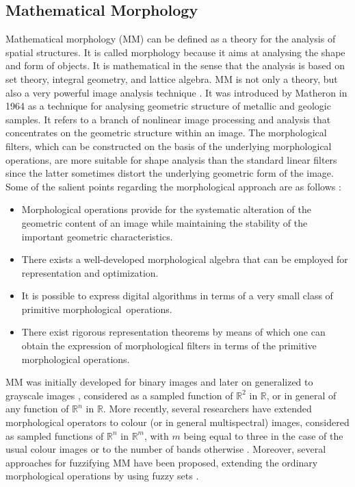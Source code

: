 \documentclass[sensors,review,accept,moreauthors,pdftex,10pt,a4paper]{mdpi}
\begin{document}
\fi
\subsection{Mathematical Morphology}
Mathematical morphology (MM) can be defined as a theory for the analysis of spatial structures. It is called morphology because it aims at analysing the shape and form of objects. It is mathematical in the sense that the analysis is based on set theory, integral geometry, and lattice algebra. MM is not only a theory, but also a very powerful image analysis technique \cite{Soille2004}.
It was introduced by Matheron in 1964 as a technique for analysing geometric structure of metallic and geologic samples. It refers to a branch of nonlinear image processing and analysis that concentrates on the geometric structure within an image.
The morphological filters, which can be constructed on the basis of the underlying morphological operations, are more suitable for shape analysis than the standard linear filters since the latter sometimes distort the underlying geometric form of the image. Some of the salient points regarding the morphological approach are as follows \cite{Giardina1988}:
\begin{itemize}[leftmargin=*,labelsep=5.8mm]
	\item Morphological operations provide for the systematic alteration of the geometric content of an image while maintaining the stability of the important geometric characteristics.
	\item There exists a well-developed morphological algebra that can be employed for representation and optimization.
	\item It is possible to express digital algorithms in terms of a very small class of primitive morphological~operations.
	\item There exist rigorous representation theorems by means of which one can obtain the expression of morphological filters in terms of the primitive morphological operations.
\end{itemize}

MM was initially developed for binary images and later on generalized to grayscale images \cite{Soille2004,Serra1984}, considered as a sampled function of $\mathbb{R}^{2}$ in $\mathbb{R}$, or in general of any function of $\mathbb{R}^{n}$ in $\mathbb{R}$.
More recently, several researchers have extended morphological operators to colour (or in general multispectral) images, considered as sampled functions of $\mathbb{R}^{n}$ in $\mathbb{R}^{m}$, with $m$ being equal to three in the case of the usual colour images or to the number of bands otherwise \cite{Benavent2012}.  Moreover, several approaches for fuzzifying MM have been proposed, extending the ordinary  morphological operations by using fuzzy sets \cite{Kerre2000}.
\end{document}
